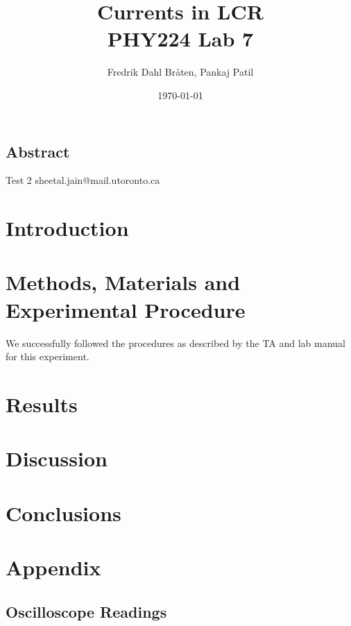 \documentclass[a4paper,12pt]{article}
\begin{document}
\title{%
Currents in LCR \\
\large PHY224 Lab 7}
\author{Fredrik Dahl Bråten, Pankaj Patil}
\date{\today}
\maketitle


\begin{center}
	\section*{Abstract}
	Test 2
	sheetal.jain@mail.utoronto.ca
\end{center}

\section{Introduction}


\section{Methods, Materials and Experimental Procedure}

We successfully followed the procedures as described by the TA and lab manual \cite{lab-manual-ex7} for this experiment.

\section{Results}



\section{Discussion}

\section{Conclusions}

\pagebreak

\appendix

\section{Appendix}

\subsection{Oscilloscope Readings}
\end{document}
